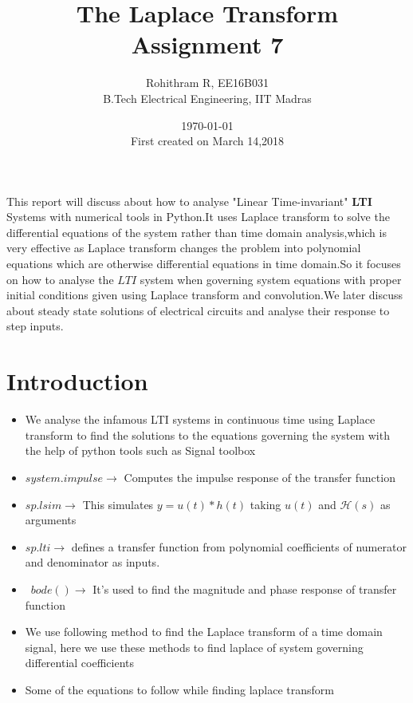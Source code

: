 \documentclass[10pt,a4paper]{article}
\title{The Laplace Transform \\ Assignment 7}
\author{Rohithram R, EE16B031 \\ B.Tech Electrical Engineering, IIT Madras}
\date{\today \\ First created on March 14,2018}
\begin{document}
    
    
    \maketitle
    
    

    
\begin{abstract}
\end{abstract}
 This report will discuss about how to analyse "Linear Time-invariant"
\textbf{LTI} Systems with numerical tools in Python.It uses Laplace
transform to solve the differential equations of the system rather than
time domain analysis,which is very effective as Laplace transform
changes the problem into polynomial equations which are otherwise
differential equations in time domain.So it focuses on how to analyse
the \(LTI\) system when governing system equations with proper initial
conditions given using Laplace transform and convolution.We later
discuss about steady state solutions of electrical circuits and analyse
their response to step inputs.

    \section{Introduction}\label{introduction}

\begin{itemize}
\item
  We analyse the infamous LTI systems in continuous time using Laplace
  transform to find the solutions to the equations governing the system
  with the help of python tools such as Signal toolbox\\
\item
  \(system.impulse \to\) Computes the impulse response of the transfer
  function
\item
  \(sp.lsim \to\) This simulates \(y=u(t)*h(t)\) taking \(u(t)\) and  $\mathcal{H}(s)$ as arguments
\item
  \(sp.lti \to\) defines a transfer function from polynomial
  coefficients of numerator and denominator as inputs.
\item
  \ $bode() \to $ It's used to find the magnitude and phase response of
  transfer function
\item
  We use following method to find the Laplace transform of a time domain
  signal, here we use these methods to find laplace of system governing
  differential coefficients
\item
  Some of the equations to follow while finding laplace transform
\end{itemize}
\end{document}
